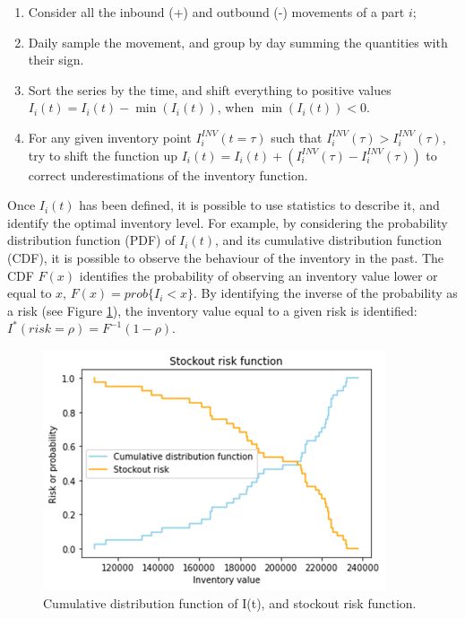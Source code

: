 \begin{enumerate}
    \item Consider all the inbound (+) and outbound (-) movements of a part $i$;
	\item Daily sample the movement, and group by day summing the quantities with their sign.
	\item Sort the series by the time, and shift everything to positive values $I_i\left(t\right)=I_i\left(t\right)-\min(I_i\left(t\right))$, when $\min{\left(I_i\left(t\right)\right)}<0$.
	\item For any given inventory point $I_i^{INV}(t=\tau)$ such that $I_i^{INV}\left(\tau\right)>I_i^{INV}\left(\tau\right)$, try to shift the function up $I_i\left(t\right)=I_i\left(t\right)+(I_i^{INV}\left(\tau\right)-I_i^{INV}\left(\tau\right))$ to correct underestimations of the inventory function.

\end{enumerate}

Once $I_i(t)$ has been defined, it is possible to use statistics to describe it, and identify the optimal inventory level. For example, by considering the probability distribution function (PDF) of $I_i(t)$, and its cumulative distribution function (CDF), it is possible to observe the behaviour of the inventory in the past. The CDF $F(x)$ identifies the probability of observing an inventory value lower or equal to $x$, $F\left(x\right)=prob\{I_i<x\}$. By identifying the inverse of the probability as a risk (see Figure \ref{fig_stockout}), the inventory value equal to a given risk is identified: $I^\ast\left(risk=\rho\right)=F^{-1}\left(1-\rho\right)$. 

\begin{figure}[hbt!]
\centering
\includegraphics[width=0.9\textwidth]{SectionWarehouses/design_figures/fig_stockout.png}
\captionsetup{type=figure}
\caption{Cumulative distribution function of I(t), and stockout risk function.}
\label{fig_stockout}
\end{figure}

